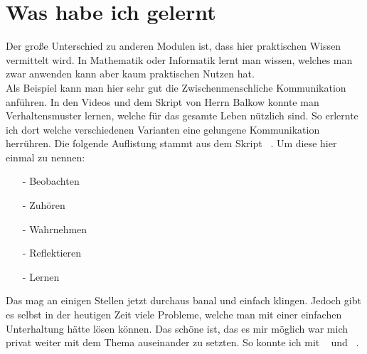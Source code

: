 \chapter{Was habe ich gelernt}

Der große Unterschied zu anderen Modulen ist, dass hier praktischen Wissen vermittelt wird. In Mathematik oder Informatik lernt man wissen, welches man zwar anwenden kann aber kaum praktischen Nutzen hat.\\
Als Beispiel kann man hier sehr gut die Zwischenmenschliche Kommunikation anführen. In den Videos und dem Skript von Herrn Balkow konnte man Verhaltensmuster lernen, welche für das gesamte Leben nützlich sind. So erlernte ich dort welche verschiedenen Varianten eine gelungene Kommunikation herrühren. Die folgende Auflistung stammt aus dem Skript ~\cite{Skript}. Um diese hier einmal zu nennen:
\begin{itemize}
	\item[-] Beobachten
	\item[-] Zuhören
	\item[-] Wahrnehmen
	\item[-] Reflektieren
	\item[-] Lernen
\end{itemize} 
 
Das mag an einigen Stellen jetzt durchaus banal und einfach klingen. Jedoch gibt es selbst in der heutigen Zeit viele Probleme, welche man mit einer einfachen Unterhaltung hätte lösen können. Das schöne ist, das es mir möglich war mich privat weiter mit dem Thema auseinander zu setzten. So konnte ich mit ~\cite{Schlüssel} und ~\cite{fRede}.